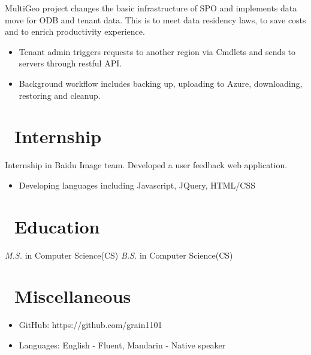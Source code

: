 \documentclass{resume}
\begin{document}
 { }
MultiGeo project changes the basic infrastructure of SPO and implements data move for ODB and tenant data. This is to meet data residency laws,
to save costs and to enrich productivity experience.
\begin{itemize}
  \item Tenant admin triggers requests to another region via Cmdlets and sends to servers through restful API.
  \item Background workflow includes backing up, uploading to Azure, downloading, restoring and cleanup.
\end{itemize}

\section{\faUsers\ Internship}
Internship in Baidu Image team. Developed a user feedback web application.
\begin{itemize}
\item Developing languages including Javascript, JQuery, HTML/CSS
\end{itemize}

\section{\faGraduationCap\ Education}
\textit{M.S.} in Computer Science(CS)
\textit{B.S.} in Computer Science(CS)



\section{\faInfo\ Miscellaneous}
\begin{itemize}[parsep=0.5ex]
  \item GitHub: https://github.com/grain1101
  \item Languages: English - Fluent, Mandarin - Native speaker
\end{itemize}

%
%
\end{document}
